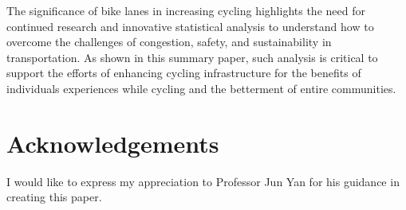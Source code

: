 \documentclass[12pt, letterpaper]{article}
\begin{document}
The significance of bike lanes in increasing cycling highlights the need for continued research and innovative statistical analysis to understand how to overcome the challenges of congestion, safety, and sustainability in transportation. As shown in this summary paper, such analysis is critical to support the efforts of enhancing cycling infrastructure for the benefits of individuals experiences while cycling and the betterment of entire communities. 


\section{Acknowledgements}
\label{sec:acknow}

I would like to express my appreciation to Professor Jun Yan for his guidance in creating this paper. 


\end{document}
